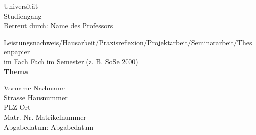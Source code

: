 Universität\\
Studiengang\\
Betreut durch: Name des Professors\\

\vspace{5cm}
\begin{center}
    Leistungsnachweis/Hausarbeit/Praxisreflexion/Projektarbeit/Seminararbeit/Thesenpapier\\
    im Fach Fach im Semester (z. B. SoSe 2000)\\
    
    \vspace{3cm}
    \textbf{Thema}
\end{center}
\vfill

Vorname Nachname\\
Strasse Hausnummer\\
PLZ Ort\\
Matr.-Nr. Matrikelnummer\\

Abgabedatum: Abgabedatum
\thispagestyle{empty}    
\cleardoublepage